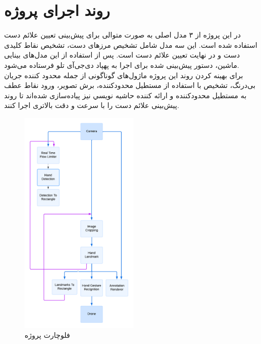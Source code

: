 \section{روند اجرای پروژه}
در این پروژه از ۳ مدل اصلی به صورت متوالی برای پیش‌بینی تعیین علائم دست استفاده شده‌ است. این سه مدل شامل تشخیص مرز‌های دست، تشخیص نقاط کلیدی دست و در نهایت تعیین علائم دست است. پس از استفاده از این مدل‌های بینایی ماشین، دستور پیش‌بینی شده برای اجرا به پهپاد دی‌جی‌آی تلو فرستاده می‌شود.
\\
برای بهینه کردن روند این پروژه ماژول‌های گوناگونی از جمله محدود كننده جريان بی‌درنگ، تشخيص با استفاده از مستطيل محدودکننده، برش تصوير،  ورود نقاط عطف به مستطيل محدودکننده و ارائه كننده حاشيه نويسي نیز پیاده‌سازی شده‌اند تا روند پیش‌بینی علائم دست را با سرعت و دقت بالاتری اجرا کنند.

\begin{figure}[h]
    \centering
    \includegraphics[width=0.5\textwidth]{flowchart.png}
    \caption{فلوچارت پروژه}
\end{figure}




